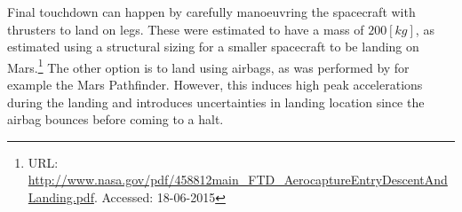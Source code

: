 Final touchdown can happen by carefully manoeuvring the spacecraft with thrusters to land on legs. These were estimated to have a mass of $200 \left[kg\right]$, as estimated using a structural sizing for a smaller spacecraft to be landing on Mars.\footnote{URL: \url{http://www.nasa.gov/pdf/458812main_FTD_AerocaptureEntryDescentAndLanding.pdf}. Accessed: 18-06-2015} The other option is to land using airbags, as was performed by for example the Mars Pathfinder. However, this induces high peak accelerations during the landing and introduces uncertainties in landing location since the airbag bounces before coming to a halt.
